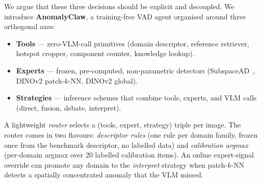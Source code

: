 We argue that these three decisions should be explicit and decoupled. We introduce \textbf{AnomalyClaw}, a training-free VAD agent organised around three orthogonal axes:

\begin{itemize}
    \item \textbf{Tools} --- zero-VLM-call primitives (domain descriptor, reference retriever, hotspot cropper, component counter, knowledge lookup).
    \item \textbf{Experts} --- frozen, pre-computed, non-parametric detectors (SubspaceAD~\citep{subspacead2026}, DINOv2 patch-$k$-NN, DINOv2 global).
    \item \textbf{Strategies} --- inference schemes that combine tools, experts, and VLM calls (direct, fusion, debate, interpret).
\end{itemize}

A lightweight \emph{router} selects a (tools, expert, strategy) triple per image. The router comes in two flavours: \emph{descriptor rules} (one rule per domain family, frozen once from the benchmark descriptor, no labelled data) and \emph{calibration argmax} (per-domain argmax over 20 labelled calibration items). An online expert-signal override can promote any domain to the \emph{interpret} strategy when patch-$k$-NN detects a spatially concentrated anomaly that the VLM missed.

